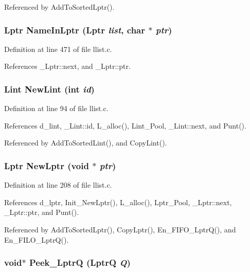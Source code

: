 Referenced by Add\-To\-Sorted\-Lptr().
\subsubsection{\setlength{\rightskip}{0pt plus 5cm}\bf{Lptr} Name\-In\-Lptr (\bf{Lptr} {\em list}, char $\ast$ {\em ptr})}\label{llist_8h_b3a105ba6c7bd6f9e20f0eb82a21ba06}




Definition at line 471 of file llist.c.

References \_\-Lptr::next, and \_\-Lptr::ptr.
\subsubsection{\setlength{\rightskip}{0pt plus 5cm}\bf{Lint} New\-Lint (int {\em id})}\label{llist_8h_c284645effb44db37e098aa125e74507}




Definition at line 94 of file llist.c.

References d\_\-lint, \_\-Lint::id, L\_\-alloc(), Lint\_\-Pool, \_\-Lint::next, and Punt().

Referenced by Add\-To\-Sorted\-Lint(), and Copy\-Lint().
\subsubsection{\setlength{\rightskip}{0pt plus 5cm}\bf{Lptr} New\-Lptr (void $\ast$ {\em ptr})}\label{llist_8h_ed0767ec2ada56f7616613df6631082d}




Definition at line 208 of file llist.c.

References d\_\-lptr, Init\_\-New\-Lptr(), L\_\-alloc(), Lptr\_\-Pool, \_\-Lptr::next, \_\-Lptr::ptr, and Punt().

Referenced by Add\-To\-Sorted\-Lptr(), Copy\-Lptr(), En\_\-FIFO\_\-Lptr\-Q(), and En\_\-FILO\_\-Lptr\-Q().
\subsubsection{\setlength{\rightskip}{0pt plus 5cm}void$\ast$ Peek\_\-Lptr\-Q (\bf{Lptr\-Q} {\em Q})}\label{llist_8h_0afd3f316caf055b52bf9d541b63f355}




